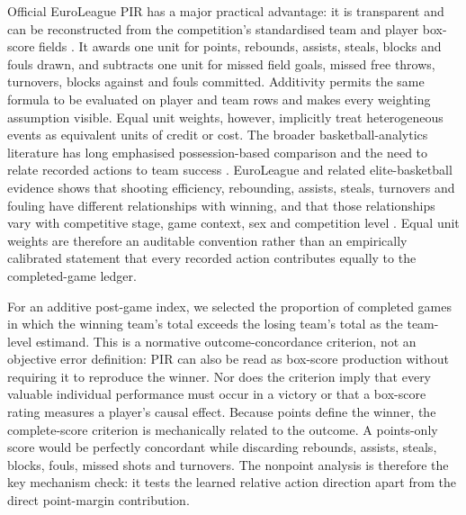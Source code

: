 \documentclass[pdflatex,sn-mathphys-num]{sn-jnl}
\begin{document}
Official EuroLeague PIR has a major practical advantage: it is transparent and can be reconstructed from the competition's standardised team and player box-score fields \cite{EuroleagueStatsManual2025,KamitsisPolitis2025}. It awards one unit for points, rebounds, assists, steals, blocks and fouls drawn, and subtracts one unit for missed field goals, missed free throws, turnovers, blocks against and fouls committed. Additivity permits the same formula to be evaluated on player and team rows and makes every weighting assumption visible. Equal unit weights, however, implicitly treat heterogeneous events as equivalent units of credit or cost. The broader basketball-analytics literature has long emphasised possession-based comparison and the need to relate recorded actions to team success \cite{Oliver2004,KubatkoEtAl2007}. EuroLeague and related elite-basketball evidence shows that shooting efficiency, rebounding, assists, steals, turnovers and fouling have different relationships with winning, and that those relationships vary with competitive stage, game context, sex and competition level \cite{Ozmen2016,Cene2018,MikolajecEtAl2021,CharamisEtAl2023,SansoneEtAl2024,IbanezEtAl2008,CabarkapaEtAl2022}. Equal unit weights are therefore an auditable convention rather than an empirically calibrated statement that every recorded action contributes equally to the completed-game ledger.

For an additive post-game index, we selected the proportion of completed games in which the winning team's total exceeds the losing team's total as the team-level estimand. This is a normative outcome-concordance criterion, not an objective error definition: PIR can also be read as box-score production without requiring it to reproduce the winner. Nor does the criterion imply that every valuable individual performance must occur in a victory or that a box-score rating measures a player's causal effect. Because points define the winner, the complete-score criterion is mechanically related to the outcome. A points-only score would be perfectly concordant while discarding rebounds, assists, steals, blocks, fouls, missed shots and turnovers. The nonpoint analysis is therefore the key mechanism check: it tests the learned relative action direction apart from the direct point-margin contribution.
\end{document}
